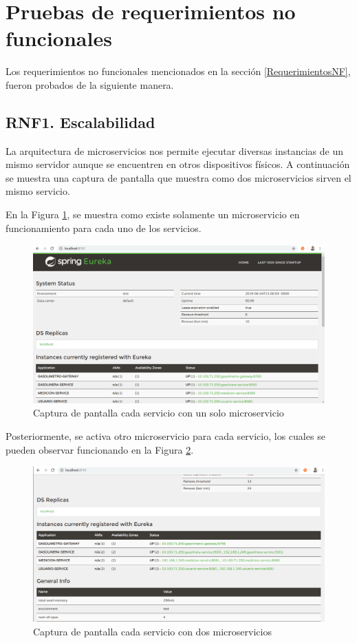 \section{Pruebas de requerimientos no funcionales}
Los requerimientos no funcionales mencionados en la sección \ref{RequerimientosNF}, fueron probados de la siguiente manera.

\subsection{RNF1. Escalabilidad}

La arquitectura de microservicios nos permite ejecutar diversas instancias de un mismo servidor aunque se encuentren en otros dispositivos físicos. A continuación se muestra una captura de pantalla que muestra como dos microservicios sirven el mismo servicio.

En la Figura \ref{fig:micro1}, se muestra como existe solamente un microservicio en funcionamiento para cada uno de los servicios.
\begin{figure}[H]
	\centering
	\includegraphics[scale=.36]{Capitulo6/no-funcionales/images/micro1}
	\caption{Captura de pantalla cada servicio con un solo microservicio}
	\label{fig:micro1}
\end{figure}

Posteriormente, se activa otro microservicio para cada servicio, los cuales se pueden observar funcionando en la Figura \ref{fig:micro2}. 

\begin{figure}[H]
	\centering
	\includegraphics[scale=.36]{Capitulo6/no-funcionales/images/micro2}
	\caption{Captura de pantalla cada servicio con dos microservicios}
	\label{fig:micro2}
\end{figure}


